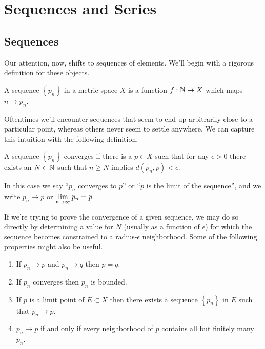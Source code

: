 \documentclass[../m131main.tex]{subfiles}
\begin{document}
\chapter{Sequences and Series}
\section{Sequences}
Our attention, now, shifts to sequences of elements.
We'll begin with a rigorous definition for these objects.

\begin{definition}[Sequence]
    A sequence $\left\{ p_n \right\}$ in a metric space $X$ is a function $f : \mathbb{N} \to X$ which maps $n \mapsto p_n$.
\end{definition}

Oftentimes we'll encounter sequences that seem to end up arbitrarily close to a particular point, whereas others never seem to settle anywhere.
We can capture this intuition with the following definition.

\begin{definition}[Convergence]
    A sequence $\left\{ p_n \right\}$ converges if there is a $p \in X$ such that for any $\epsilon > 0$ there exists an $N \in \mathbb{N}$ such that $n \geq N$ implies $d(p_n, p) < \epsilon$.
\end{definition}

In this case we say ``$p_n$ converges to $p$'' or ``$p$ is the limit of the sequence'', and we write $p_n \to p$ or $\displaystyle \lim_{n \to \infty} p_n = p$.

\vspace{-3pt}
If we're trying to prove the convergence of a given sequence, we may do so directly by determining a value for $N$ (usually as a function of $\epsilon$) for which the sequence becomes constrained to a radius-$\epsilon$ neighborhood.
Some of the following properties might also be useful.

\begin{theorem}
    \begin{enumerate}[label=(\alph*)]
        \item If $p_n \to p$ and $p_n \to q$ then $p = q$.
        \item If $p_n$ converges then $p_n$ is bounded.
        \item If $p$ is a limit point of $E \subset X$ then there exists a sequence $\left\{ p_n \right\}$ in $E$ such that $p_n \to p$.
        \item $p_n \to p$ if and only if every neighborhood of $p$ contains all but finitely many $p_n$.
    \end{enumerate}
\end{theorem}
\end{document}
